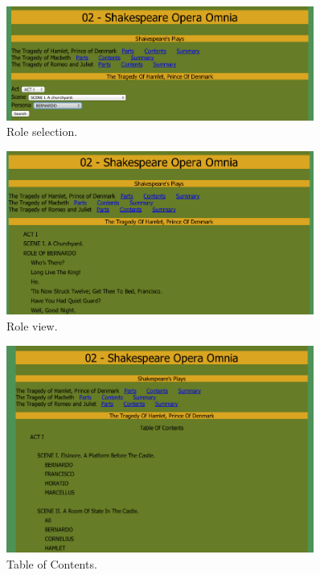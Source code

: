 \documentclass[a4paper, notitlepage]{article}
\begin{document}
\begin{figure}[ht]
\begin{center}
\includegraphics[width=0.9\textwidth]{02-2.png}
\caption{Role selection.}
\label{fig:02-2}
\end{center}
\end{figure}

\begin{figure}[ht]
\begin{center}
\includegraphics[width=0.9\textwidth]{02-3.png}
\caption{Role view.}
\label{fig:02-3}
\end{center}
\end{figure}

\begin{figure}[ht]
\begin{center}
\includegraphics[width=0.9\textwidth]{02-4.png}
\caption{Table of Contents.}
\label{fig:02-4}
\end{center}
\end{figure}
\end{document}
